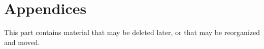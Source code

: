 \part{Appendices}

This part contains material that may be deleted later, or that may be
reorganized and moved.  

\appendix
{}

